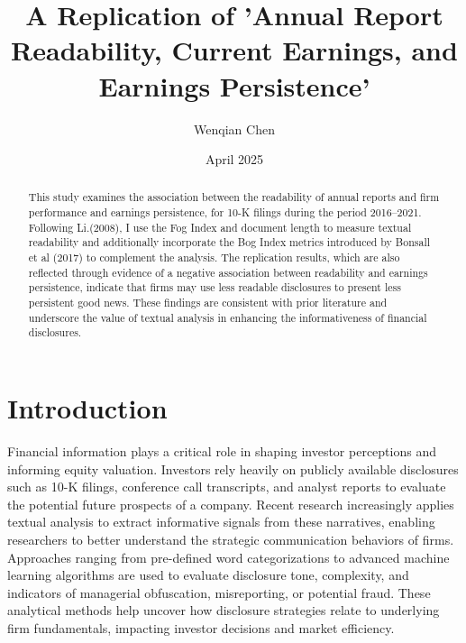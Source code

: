 \documentclass[a4paper]{article}
\title{A Replication of 'Annual Report Readability, Current Earnings, and Earnings Persistence'}
\author{Wenqian Chen}
\date{April 2025}
\begin{document}
\maketitle

\begin{abstract}
This study examines the association between the readability of annual reports and firm performance and earnings persistence, for 10-K filings during the period 2016–2021. Following Li.(2008), I use the Fog Index and document length to measure textual readability and additionally incorporate the Bog Index metrics introduced by Bonsall et al (2017) to complement the analysis. The replication results, which are also reflected through evidence of a negative association between readability and earnings persistence, indicate that firms may use less readable disclosures to present less persistent good news. These findings are consistent with prior literature and underscore the value of textual analysis in enhancing the informativeness of financial disclosures.

\end{abstract}

\section{Introduction}

Financial information plays a critical role in shaping investor perceptions and informing equity valuation. Investors rely heavily on publicly available disclosures such as 10-K filings, conference call transcripts, and analyst reports to evaluate the potential future prospects of a company. Recent research increasingly applies textual analysis to extract informative signals from these narratives, enabling researchers to better understand the strategic communication behaviors of firms. Approaches ranging from pre-defined word categorizations to advanced machine learning algorithms are used to evaluate disclosure tone, complexity, and indicators of managerial obfuscation, misreporting, or potential fraud. These analytical methods help uncover how disclosure strategies relate to underlying firm fundamentals, impacting investor decisions and market efficiency.\par
\end{document}
